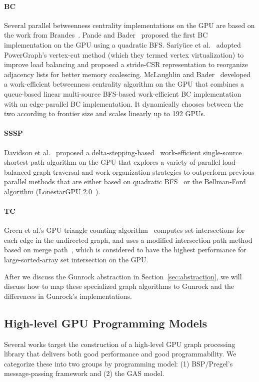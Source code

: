 \documentclass[format=acmsmall,review=false,screen=true]{acmart}
\begin{document}
\paragraph{BC} Several parallel betweenness centrality implementations
on the GPU are based on the work from
Brandes~. Pande and
Bader~ proposed the first BC implementation
on the GPU using a quadratic BFS\@. Sariy\"{u}ce et
al.~ adopted PowerGraph's vertex-cut
method (which they termed vertex virtualization) to improve load
balancing and proposed a stride-CSR representation to reorganize
adjacency lists for better memory coalescing. McLaughlin and
Bader~ developed a work-efficient
betweenness centrality algorithm on the GPU that combines a
queue-based linear multi-source BFS-based work-efficient BC
implementation with an edge-parallel BC implementation. It dynamically
chooses between the two according to frontier size and scales linearly
up to 192 GPUs.

\paragraph{SSSP} Davidson et al.~
proposed a delta-stepping-based~\cite{Meyer:2003:DAP} work-efficient
single-source shortest path algorithm on the GPU that explores a
variety of parallel load-balanced graph traversal and work
organization strategies to outperform previous parallel methods that
are either based on quadratic BFS~\cite{Harish:2007:ALG} or the
Bellman-Ford algorithm (LonestarGPU 2.0~\cite{Burtscher:2012:QSI}).

\paragraph{TC} Green et al.'s GPU
triangle counting algorithm~\cite{Green:2014:FTC} computes set
intersections for each edge in the undirected graph, and uses a
modified intersection path method based on merge
path~\cite{Green:2012:GMP}, which is considered to have the highest
performance for large-sorted-array set intersection on the GPU\@.

After we discuss the Gunrock abstraction in
Section~\ref{sec:abstraction}, we will discuss how to map these
specialized graph algorithms to Gunrock and the differences in
Gunrock's implementations.

\subsection{High-level GPU Programming Models}
\label{subsec:gpu2}
Several works target the construction of a high-level GPU graph
processing library that delivers both good performance and good
programmability. We categorize these into two groups by programming
model: (1) BSP/Pregel's message-passing framework and (2) the GAS
model.
\end{document}
